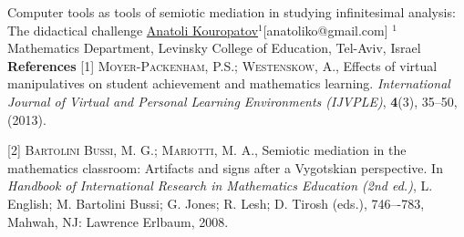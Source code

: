 \begin{abstract_online}{Computer tools as tools of semiotic mediation in
studying infinitesimal analysis: The didactical challenge}{%
        \underline{Anatoli Kouropatov}$^{1}$}{[anatoliko@gmail.com]
        }{%
        $^1$ Mathematics Department, Levinsky College of Education,
Tel-Aviv, Israel}
\textbf{References} \newline{}
[1] \textsc{Moyer-Packenham, P.S.; Westenskow, A.},
Effects of virtual manipulatives on student achievement and mathematics
learning.
\emph{International Journal of Virtual and Personal Learning Environments
(IJVPLE)}, \textbf{4}(3), 35--50, (2013).

[2] \textsc{Bartolini Bussi, M. G.; Mariotti, M. A.},
Semiotic mediation in the mathematics classroom: Artifacts and signs
after a Vygotskian perspective.
In \emph{Handbook of International Research in Mathematics Education (2nd ed.)},
L. English; M. Bartolini Bussi; G. Jones; R. Lesh; D. Tirosh (eds.),
746–-783, Mahwah, NJ: Lawrence Erlbaum, 2008.

\end{abstract_online}
